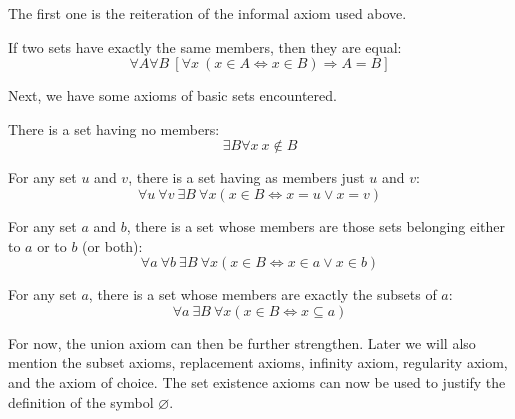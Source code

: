 The first one is the reiteration of the informal axiom used above. 
\begin{axiom}
    If two sets have exactly the same members, then they are equal: \begin{equation}
        \forall A \forall B \: [\forall x\:(x \in A \Leftrightarrow x\in B)\Rightarrow A = B]
    \end{equation}
\end{axiom}
Next, we have some axioms of basic sets encountered. 
\begin{axiom}
    There is a set having no members: \begin{equation}
        \exists B \forall x \: x \not\in B
    \end{equation}   
\end{axiom}
\begin{axiom}
    For any set $u$ and $v$, there is a set having as members just $u$ and $v$: \begin{equation}
        \forall u \:\forall v \:\exists B\: \forall x (x\in B \Leftrightarrow x= u \lor x = v)
    \end{equation}
\end{axiom}
\begin{axiom}
    For any set $a$ and $b$, there is a set whose members are those sets belonging either to $a$ or to $b$ (or both): \begin{equation}
        \forall a \: \forall b\: \exists B \: \forall x (x\in B \Leftrightarrow x\in a \lor x \in b)
    \end{equation}
\end{axiom}
\begin{axiom}
    For any set $a$, there is a set whose members are exactly the subsets of $a$: \begin{equation}
        \forall a \: \exists B \: \forall x (x\in B \Leftrightarrow x\subseteq a)
    \end{equation}
\end{axiom}
For now, the union axiom can then be further strengthen. Later we will also mention the subset axioms, replacement axioms, infinity axiom, regularity axiom, and the axiom of choice. The set existence axioms can now be used to justify the definition of the symbol $\varnothing$. 

